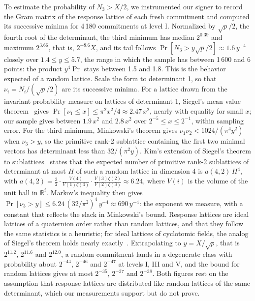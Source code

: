 \documentclass[version=preprint]{iacrcc}
\begin{document}
    To estimate the probability of $N_3 > X/2$, we instrumented our signer to
    record the Gram matrix of the response lattice of each fresh commitment
    and computed its successive minima for 4\,180 commitments at level I.
    Normalized by $\sqrt{p}/2$, the fourth root of the determinant, the third
    minimum has median $2^{0.39}$ and maximum $2^{3.66}$, that is, $2^{-8.6}X$,
    and its tail follows $\Pr[N_3 > y\sqrt{p}/2] \approx 1.6\,y^{-4}$ closely
    over $1.4 \le y \le 5.7$, the range in which the sample has between 1\,600
    and 6 points: the product $y^4 \Pr$ stays between 1.5 and 1.8. This is
    the behavior expected of a random lattice. Scale the form to determinant
    1, so that $\nu_i = N_i/(\sqrt p/2)$ are its successive minima. For a
    lattice drawn from the invariant probability measure on lattices of
    determinant 1, Siegel's mean value theorem~\cite{Sie45} gives
    $\Pr[\nu_1 \le x] \le \pi^2 x^2/4 \approx 2.47\,x^2$, nearly with
    equality for small $x$; our sample gives between $1.9\,x^2$ and
    $2.8\,x^2$ over $2^{-5} \le x \le 2^{-1}$, within sampling error. For the third
    minimum, Minkowski's theorem gives $\nu_1 \nu_2 < 1024/(\pi^4 y^2)$
    when $\nu_3 > y$, so the primitive rank-2 sublattice containing the first
    two minimal vectors has determinant less than $32/(\pi^2 y)$. Kim's
    extension of Siegel's theorem to sublattices~\cite[Theorem 3]{Kim22}
    states that the expected number of primitive rank-2 sublattices of
    determinant at most $H$ of such a random lattice in dimension 4 is
    $a(4, 2)\,H^4$, with $a(4, 2) = \frac{3}{2} \cdot
    \frac{V(4)}{V(1)\zeta(4)} \cdot \frac{V(3)\zeta(2)}{V(2)\zeta(3)}
    \approx 6.24$, where $V(i)$ is the volume of the unit ball in
    $\mathbb{R}^i$. Markov's inequality then gives $\Pr[\nu_3 > y] \le
    6.24\,(32/\pi^2)^4\,y^{-4} \approx 690\,y^{-4}$: the exponent we
    measure, with a constant that reflects the slack in Minkowski's bound.
    Response lattices are ideal lattices of a quaternion order rather than
    random lattices, and that they follow the same statistics is a
    heuristic; for ideal lattices of cyclotomic fields, the analog of Siegel's
    theorem holds nearly exactly~\cite{GV24}. Extrapolating to $y = X/\sqrt p$, that is
    $2^{11.2}$, $2^{11.6}$ and $2^{12.0}$, a random commitment lands in a
    degenerate class with probability about $2^{-44}$, $2^{-46}$ and
    $2^{-47}$ at levels I, III and V, and the bound for random lattices
    gives at most $2^{-35}$, $2^{-37}$ and $2^{-38}$. Both figures rest on
    the assumption that response lattices are distributed like random
    lattices of the same determinant, which our measurements support but do
    not prove.
\end{document}
